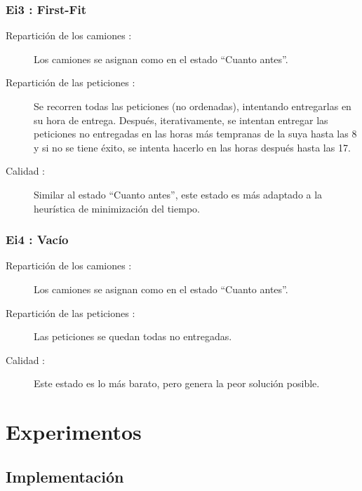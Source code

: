 \documentclass{article}
\begin{document}
\subsubsection{Ei3 : First-Fit}

\begin{description}
\item[Repartición de los camiones :] Los camiones se asignan como en el estado
``Cuanto antes''.
\item[Repartición de las peticiones :] Se recorren todas las peticiones (no
ordenadas), intentando entregarlas en su hora de entrega. Después,
iterativamente, se intentan entregar las peticiones no entregadas en las horas
más tempranas de la suya hasta las 8 y si no se tiene éxito, se intenta hacerlo
en las horas después hasta las 17.
\item[Calidad :] Similar al estado ``Cuanto antes'', este estado es más adaptado
a la heurística de minimización del tiempo.
\end{description}

\subsubsection{Ei4 : Vacío}

\begin{description}
\item[Repartición de los camiones :] Los camiones se asignan como en el estado
``Cuanto antes''.
\item[Repartición de las peticiones :] Las peticiones se quedan todas no
entregadas.
\item[Calidad :] Este estado es lo más barato, pero genera la peor solución
posible.
\end{description}

\newpage

\section{Experimentos}

\subsection{Implementación}
\end{document}
